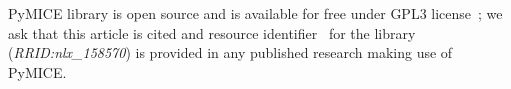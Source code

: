 PyMICE library is open source and is available for free 
under GPL3 license~\cite{gpl}; we ask that this article is cited and resource
identifier~\cite{ozyurt2016} for the library (\emph{RRID:nlx\_158570}) is provided 
in any published research making use of PyMICE.
